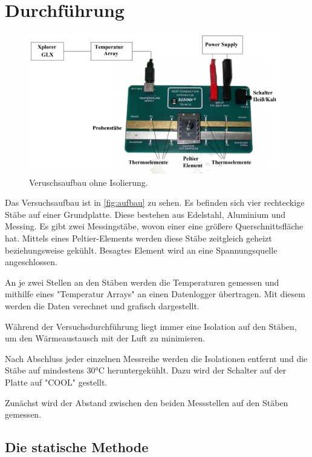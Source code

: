 \newpage
\section{Durchführung}
\label{sec:Durchführung}

\begin{figure}
  \centering
  \includegraphics[width=0.98\textwidth]{content/aufbau.PNG}
  \caption{Veruschsaufbau ohne Isolierung.\cite[3]{v204}}
  \label{fig:aufbau}
\end{figure}

Das Versuchsaufbau ist in \autoref{fig:aufbau} zu sehen. Es befinden sich vier rechteckige Stäbe auf einer Grundplatte.
Diese bestehen aus Edelstahl, Aluminium und Messing. Es gibt zwei Messingstäbe, wovon einer eine größere Querschnittsfläche hat. 
Mittels eines Peltier-Elements werden diese Stäbe zeitgleich geheizt beziehungsweise gekühlt.
Besagtes Element wird an eine Spannungsquelle angeschlossen.

An je zwei Stellen an den Stäben werden die Temperaturen gemessen und mithilfe eines "Temperatur Arrays" an einen Datenlogger übertragen.
Mit diesem werden die Daten verechnet und grafisch dargestellt.

Während der Versuchsdurchführung liegt immer eine Isolation auf den Stäben, um den Wärmeaustausch mit der Luft zu minimieren.

Nach Abschluss jeder einzelnen Messreihe werden die Isolationen entfernt und die Stäbe auf mindestens 30°C heruntergekühlt.
Dazu wird der Schalter auf der Platte auf "COOL" gestellt.

Zunächst wird der Abstand zwischen den beiden Messstellen auf den Stäben gemessen.


\subsection{Die statische Methode}

